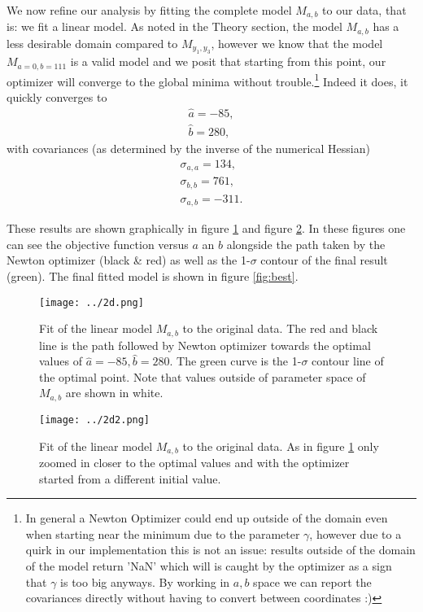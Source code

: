 \documentclass[notitlepage, 12pt, a4paper, twoside, titlepage]{article}
\begin{document}
\par We now refine our analysis by fitting the complete model $M_{a,b}$ to our data, that is: we fit a linear model. As noted in the Theory section, the model $M_{a,b}$ has
a less desirable domain compared to $M_{y_1,y_3}$, however we know that the model $M_{a=0,b=111}$ is a valid model and
we posit that starting from this point, our optimizer will converge to the global minima without trouble.\footnote{In general a Newton Optimizer could end up outside of the domain even when starting near the minimum due to the parameter $\gamma$, however due to a quirk in our implementation this is not an issue: results outside of the domain of the model return 'NaN' which
will is caught by the optimizer as a sign that $\gamma$ is too big anyways. By working in $a,b$ space we can report the covariances directly without having to convert between coordinates :)}
 Indeed it does, it quickly converges to
 \begin{align}
	 \hat a = -85,\\
	 \hat b = 280,
 \end{align}
with covariances (as determined by the inverse of the numerical Hessian)
\begin{align}
	\sigma_{a,a} =  134,\\
	\sigma_{b,b} = 761,\\
	\sigma_{a,b} = -311.
\end{align}

\par These results are shown graphically in figure \ref{fig:2d} and figure \ref{fig:2d2}. In these figures one can see the objective function versus $a$ an $b$ alongside the path taken by the Newton optimizer (black \& red) as well as the 1-$\sigma$ contour of the final result (green). The final fitted model is shown in figure \ref{fig:best}.

\begin{figure}[h!]
  \texttt{[image: ../2d.png]}
  \caption{Fit of the linear model $M_{a,b}$ to the original data. The red and black line is the path followed by Newton optimizer towards the optimal values of $\hat a = -85, \hat b = 280$. The green curve is the 1-$\sigma$ contour line of the optimal point. Note that values outside of parameter space of $M_{a,b}$ are shown in white.}
  \label{fig:2d}
\end{figure}

\begin{figure}[h!]
  \texttt{[image: ../2d2.png]}
  \caption{Fit of the linear model $M_{a,b}$ to the original data. As in figure \ref{fig:2d} only zoomed in closer to the optimal values and with the optimizer started from a different initial value.}
  \label{fig:2d2}
\end{figure}
\end{document}

